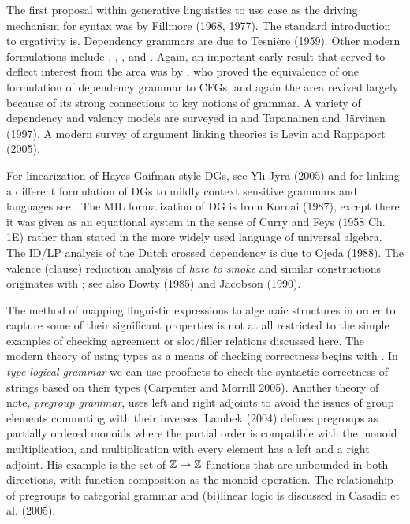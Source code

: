 The first proposal within generative linguistics to use case as the driving
mechanism for syntax was by Fillmore (1968, 1977). The standard introduction
to ergativity is. Dependency grammars
\nocite{Fillmore:1968}\nocite{Fillmore:1977}\nocite{Tesnie1re:1959} are due to
Tesni\`ere (1959). Other modern formulations include ,
, , and .
Again, an important early result that served to deflect interest from the area
was by , who proved the equivalence of one formulation
of dependency grammar to CFGs, and again the area revived largely because of
its strong connections to key notions of grammar. A variety of dependency and
valency models are surveyed in  and
\nocite{Tapanainen:1997} Tapanainen and J\"arvinen (1997). A modern survey of
argument linking theories is Levin and Rappaport (2005).\nocite{Levin:2005}

For linearization of Hayes-Gaifman-style DGs, see Yli-Jyr\"{a} (2005) and for
linking a different formulation of DGs to mildly context sensitive grammars
and languages see . The MIL formalization of DG is from
Kornai (1987), except there it was given as an equational system in the sense
of \nocite{Curry:1958} Curry and Feys (1958 Ch. 1E) rather than stated in the
more widely used language of universal algebra. \nocite{Kornai:1987} The ID/LP
analysis of the Dutch crossed dependency is due to Ojeda (1988). The valence
(clause) reduction analysis of {\it hate to smoke} and similar constructions
originates with ; see also Dowty (1985) and Jacobson
(1990).\nocite{Ojeda:1988}\nocite{Dowty:1985}\nocite{Jacobson:1990}\nocite{Yli-Jyra2:2005}

The method of mapping linguistic expressions to algebraic structures in order
to capture some of their significant properties is not at all restricted to
the simple examples of checking agreement or slot/filler relations discussed
here. The modern theory of using types as a means of checking correctness
begins with . In {\it type-logical
  grammar} we can use proofnets to check the
syntactic correctness of strings based on their types (Carpenter and Morrill
2005). Another theory of note, {\it pregroup grammar},
uses left and right adjoints to avoid the issues of group elements commuting
with their inverses.  Lambek (2004) defines pregroups as partially ordered
monoids where the partial order is compatible with the monoid multiplication,
and multiplication with every element has a left and a right adjoint. His
example is the set of ${\Bbb Z} \rightarrow {\Bbb Z}$ functions that are
unbounded in both directions, with function composition as the monoid
operation. The relationship of pregroups to categorial grammar and (bi)linear
logic is discussed in Casadio et al. (2005).
\nocite{Lambek:2004}\nocite{Casadio:2005}\nocite{Carpenter:2005}

